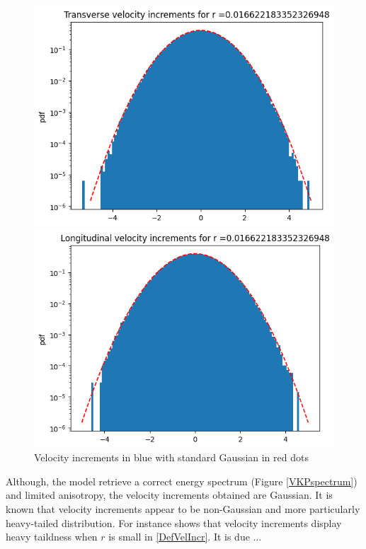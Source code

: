 \documentclass[a4paper,12pt]{article}
\theoremstyle{definition}
\begin{document}
\begin{figure}[H]
    \centering
    \begin{minipage}{0.49\textwidth}
        \centering
        \includegraphics[width=\linewidth]{illustrations/TransVelIncrExample.png}
    \end{minipage}
    \hfill
    \begin{minipage}{0.49\textwidth}
        \centering
        \includegraphics[width=\linewidth]{illustrations/LongVelIncrExample.png}
    \end{minipage}
    \caption{Velocity increments in blue with standard Gaussian in red dots}
\end{figure}


\bigskip
Although, the model retrieve a correct energy spectrum (Figure \ref{VKPspectrum}) and limited anisotropy, the velocity increments obtained are Gaussian. It is known that velocity increments appear to be non-Gaussian and more particularly heavy-tailed distribution. For instance \cite{} shows that velocity increments display heavy taildness when $r$ is small in \ref{DefVelIncr}. It is due ...
\end{document}
